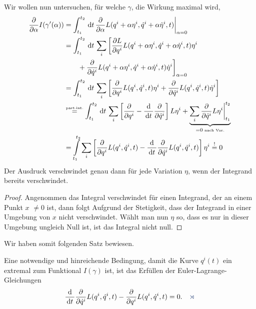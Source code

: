 Wir wollen nun untersuchen, für welche $\gamma$, die Wirkung maximal wird,
\begin{align*}
\frac{\partial}{\partial\alpha} I(\gamma'(\alpha))
&= \int_{t_1}^{t_2}\,\mathrm{d} t\, \frac{\partial}{\partial\alpha}
L(q^i + \alpha \eta^i, \dot{q}^i + \alpha\dot{\eta}^i,t)
\bigg|_{\alpha=0}\\
&= \int_{t_1}^{t_2}\,\mathrm{d} t\, \sum_i
\bigg[
\frac{\partial L}{\partial q^i} L(q^i + \alpha \eta^i, \dot{q}^i +
\alpha\dot{\eta}^i,t)\eta^i \\
 &\qquad + \frac{\partial}{\partial \dot{q}^i}L(q^i +
\alpha \eta^i, \dot{q}^i + \alpha\dot{\eta}^i,t)\dot{\eta}^i
\bigg]_{\alpha=0}\\
&= \int_{t_1}^{t_2}\,\mathrm{d} t\, \sum_i
\left[
\frac{\partial }{\partial q^i} L(q^i, \dot{q}^i, t)\eta^i +
\frac{\partial}{\partial \dot{q}^i}L(q^i, \dot{q}^i, t)\dot{\eta}^i
\right]\\
&\overset{\text{\tiny part.int.}}{=}
\int_{t_1}^{t_2}\,\mathrm{d} t\, \sum_i \left[
\frac{\partial}{\partial q^i} - \frac{\mathrm{d}}{\,\mathrm{d} t\,}\frac{\partial}{\partial
\dot{q}^i}\right]L\eta^i + \underbrace{\sum_i \frac{\partial}{\partial
\dot{q}^i}L\eta^i\bigg|_{t_1}^{t_2}}_{=0\;\text{\tiny nach Vor.}}\\
&= \int\limits_{t_1}^{t_2}
\sum_i \left[
\frac{\partial}{\partial q^i}L(q^i, \dot{q}^i, t) -
\frac{\mathrm{d}}{\,\mathrm{d} t\,}\frac{\partial}{\partial \dot{q}^i} 
L(q^i, \dot{q}^i, t)
\right]\eta^i \overset{!}{=} 0
\end{align*}
Der Ausdruck verschwindet genau dann für jede Variation $\eta$, wenn der
Integrand bereits verschwindet.
\begin{proof}
Angenommen das Integral verschwindet für einen Integrand, der an einem Punkt
$x$ $\neq 0$ ist, dann folgt Aufgrund der Stetigkeit, dass der Integrand in
einer Umgebung von $x$ nicht verschwindet. Wählt man nun $\eta$ so, dass es nur
in dieser Umgebung ungleich Null ist, ist das Integral nicht
null.\dipper\qedhere
\end{proof}

Wir haben somit folgenden Satz bewiesen.

\begin{propn}
Eine notwendige und hinreichende Bedingung, damit die Kurve $q^i(t)$ ein
extremal zum Funktional $I(\gamma)$ ist, ist das Erfüllen der
Euler-Lagrange-Gleichungen
\begin{align*}
\frac{\diffd}{\dt}\frac{\partial}{\partial \dot{q}^i}L(q^i,\dot{q}^i,t) -
\frac{\partial}{\partial q^i}L(q^i,\dot{q}^i,t) = 0.\fishhere
\end{align*}
\end{propn}


